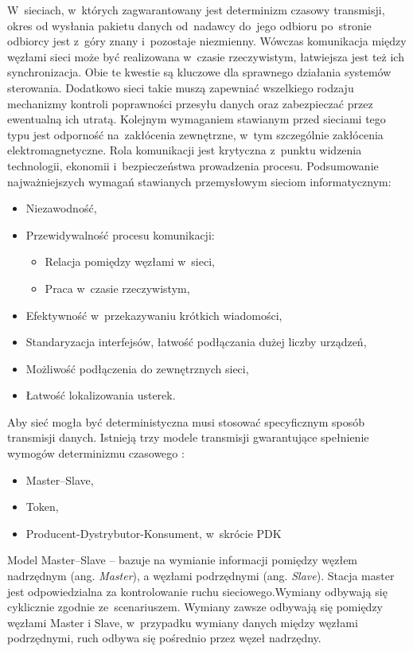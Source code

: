 W~sieciach, w~których zagwarantowany jest determinizm czasowy transmisji, okres od wysłania pakietu danych od~nadawcy do~jego odbioru po~stronie odbiorcy jest z~góry znany i~pozostaje niezmienny. Wówczas komunikacja między węzłami sieci może być realizowana w~czasie rzeczywistym, łatwiejsza jest też ich synchronizacja. Obie te kwestie są kluczowe dla sprawnego działania systemów sterowania. Dodatkowo sieci takie muszą zapewniać wszelkiego rodzaju mechanizmy kontroli poprawności przesyłu danych oraz zabezpieczać przez ewentualną ich utratą. Kolejnym wymaganiem stawianym przed sieciami tego typu jest odporność na~zakłócenia zewnętrzne, w~tym szczególnie zakłócenia elektromagnetyczne. Rola komunikacji jest krytyczna z~punktu widzenia technologii, ekonomii i~bezpieczeństwa prowadzenia procesu. \clearpage
Podsumowanie najważniejszych wymagań stawianych przemysłowym sieciom informatycznym:
\begin{itemize}
\item Niezawodność,
\item Przewidywalność procesu komunikacji:
\begin{itemize}
\item Relacja pomiędzy węzłami w~sieci,
\item Praca w~czasie rzeczywistym,
\end{itemize}
\item Efektywność w~przekazywaniu krótkich wiadomości,
\item Standaryzacja interfejsów, łatwość podłączania dużej liczby urządzeń,
\item Możliwość podłączenia do zewnętrznych sieci,
\item Łatwość lokalizowania usterek.
\end{itemize}

\vspace{5mm}
Aby sieć mogła być deterministyczna musi stosować specyficznym sposób transmisji danych.
Istnieją trzy modele transmisji gwarantujące spełnienie wymogów determinizmu czasowego \cite{kwiecien,gaj}:
\begin{itemize}
\item Master--Slave,
\item Token,
\item Producent-Dystrybutor-Konsument, w~skrócie PDK
\end{itemize}

Model Master--Slave -- bazuje na wymianie informacji pomiędzy węzłem nadrzędnym (ang. \textit{Master}), a węzłami podrzędnymi (ang. \textit{Slave}). Stacja master jest odpowiedzialna za kontrolowanie ruchu sieciowego.Wymiany odbywają się cyklicznie zgodnie ze~scenariuszem. Wymiany zawsze odbywają się pomiędzy węzłami Master i Slave, w~przypadku wymiany danych między węzłami podrzędnymi, ruch odbywa się pośrednio przez węzeł nadrzędny.

